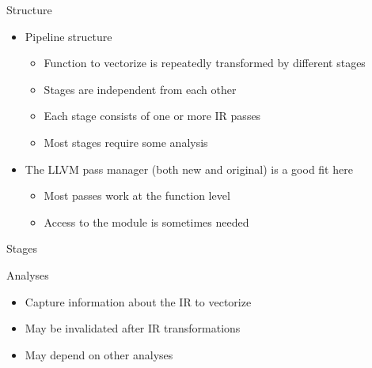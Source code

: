 \begin{frame}{Structure}

\begin{itemize}
    \item Pipeline structure
    \begin{itemize}
        \item Function to vectorize is repeatedly transformed by different stages
        \item Stages are independent from each other
        \item Each stage consists of one or more IR passes
        \item Most stages require some analysis
    \end{itemize}
    
    \item The LLVM pass manager (both new and original) is a good fit here
    \begin{itemize}
        \item Most passes work at the function level
        \item Access to the module is sometimes needed
    \end{itemize}
\end{itemize}

\end{frame}


\begin{frame}[c]{Stages}


\end{frame}


\begin{frame}{Analyses}

\begin{itemize}
    \item Capture information about the IR to vectorize
    \item May be invalidated after IR transformations
    \item May depend on other analyses
\end{itemize}

\end{frame}

